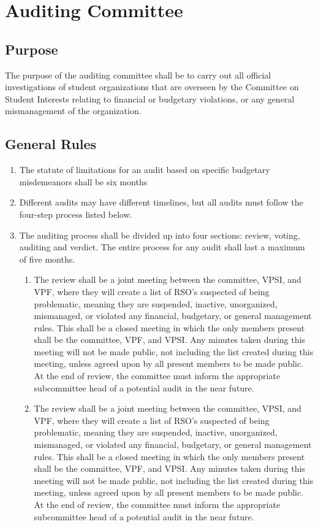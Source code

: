\documentclass[12pt]{scrreprt}
\begin{document}
\section{Auditing Committee}
\subsection{Purpose}
The purpose of the auditing committee shall be to carry out all official
investigations of student organizations that are overseen by the Committee on
Student Interests relating to financial or budgetary violations, or any general
mismanagement of the organization.

\subsection{General Rules}
\begin{enumerate}
    \item The statute of limitations for an audit based on specific budgetary misdemeanors shall be six months
    \item Different audits may have different timelines, but all audits must follow the four-step process listed below.
    \item The auditing process shall be divided up into four sections: review, voting, auditing and verdict. The entire process for any audit shall last a maximum of five months.
    \begin{enumerate}
        \item The review shall be a joint meeting between the committee, VPSI, and VPF, where they will create a list of RSO’s suspected of being problematic, meaning they are suspended, inactive, unorganized, mismanaged, or violated any financial, budgetary, or general management rules. This shall be a closed meeting in which the only members present shall be the committee, VPF, and VPSI. Any minutes taken during this meeting will not be made public, not including the list created during this meeting, unless agreed upon by
all present members to be made public. At the end of review, the
committee must inform the appropriate subcommittee head of a
potential audit in the near future.
    \item The review shall be a joint meeting between the committee, VPSI, and VPF, where they will create a list of RSO’s suspected of being problematic, meaning they are suspended, inactive, unorganized, mismanaged, or violated any financial, budgetary, or general management rules. This shall be a closed meeting in which the only members present shall be the committee, VPF, and VPSI. Any minutes taken during this meeting will not be made public, not including the list created during this meeting, unless agreed upon by all present members to be made public. At the end of review, the committee must inform the appropriate subcommittee head of a potential audit in the near future.

\end{enumerate}
\end{enumerate}
\end{document}
